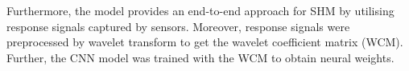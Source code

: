 Furthermore, the model provides an end-to-end approach for SHM by utilising response signals captured by sensors.
Moreover, response signals were preprocessed by wavelet transform to get the wavelet coefficient matrix (WCM).
Further, the CNN model was trained with the WCM to obtain neural weights.
